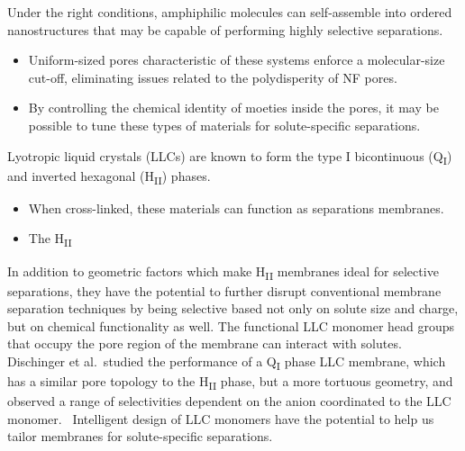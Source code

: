 \documentclass[journal=jpcbfk,manuscript=article]{achemso}
\begin{document}
  Under the right conditions, amphiphilic molecules can self-assemble
  into ordered nanostructures that may be capable of performing highly selective separations.
  \begin{itemize}
    \item Uniform-sized pores characteristic of these systems enforce a 
    molecular-size cut-off, eliminating issues related to the polydisperity 
    of NF pores.
    \item By controlling the chemical identity of moeties inside the pores, 
    it may be possible to tune these types of materials for solute-specific
    separations.
  \end{itemize}

  Lyotropic liquid crystals (LLCs) are known to form the type I bicontinuous
  (Q\textsubscript{I}) and inverted hexagonal (H\textsubscript{II}) phases.
  \begin{itemize}
	\item When cross-linked, these materials can function as separations
	 membranes.
	\item The H\textsubscript{II}
  \end{itemize}

  
  In addition to geometric factors which make H\textsubscript{II} membranes
  ideal for selective separations, they have the potential to further disrupt
  conventional membrane separation techniques by being selective based not
  only on solute size and charge, but on chemical functionality as well. 
  The functional LLC monomer head groups that occupy the pore region of the
  membrane can interact with solutes. Dischinger et al.~studied the 
  performance of a Q\textsubscript{I} phase LLC membrane, which has a 
  similar pore topology to the H\textsubscript{II} phase, but a more 
  tortuous geometry, and observed a range of selectivities dependent on the
  anion coordinated to the LLC monomer.~\cite{dischinger_effect_2017} Intelligent 
  design of LLC monomers have the potential to help us tailor membranes for 
  solute-specific separations.
\end{document}

